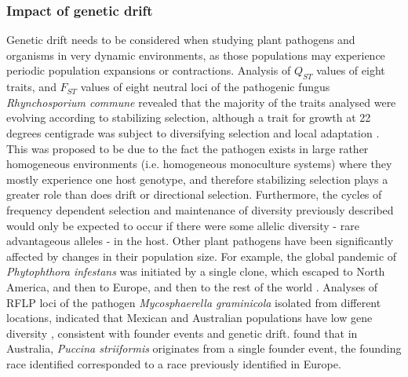 \subsubsection{Impact of genetic drift}

Genetic drift needs to be considered when studying plant pathogens and organisms in very dynamic environments, as those populations may experience periodic population expansions or contractions.
Analysis of $Q_{ST}$ values of eight traits, and $F_{ST}$ values of eight neutral loci of the pathogenic fungus \textit{Rhynchosporium commune} revealed that the majority of the traits analysed were evolving according to stabilizing selection, although a trait for growth at 22 degrees centigrade was subject to diversifying selection and local adaptation \parencite{Stefansson2014}.
This was proposed to be due to the fact the pathogen exists in large rather homogeneous environments (i.e. homogeneous monoculture systems) where they mostly experience one host genotype, and therefore stabilizing selection plays a greater role than does drift or directional selection.
Furthermore, the cycles of frequency dependent selection and maintenance of diversity previously described would only be expected to occur if there were some allelic diversity - rare advantageous alleles - in the host.
Other plant pathogens have been significantly affected by changes in their population size.
For example, the global pandemic of \textit{Phytophthora infestans} was initiated by a single clone, which escaped to North America, and then to Europe, and then to the rest of the world \parencite{Goodwin1994}.
Analyses of RFLP loci of the pathogen \textit{Mycosphaerella graminicola} isolated from different locations, indicated that Mexican and Australian populations have low gene diversity \parencite{Zhan2003a}, consistent with founder events and genetic drift.
\cite{Steele2001} found that in Australia, \textit{Puccina striiformis} originates from a single founder event, the founding race identified corresponded to a race previously identified in Europe.
